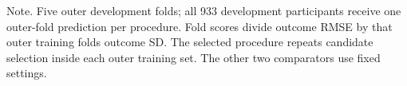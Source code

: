 \documentclass[11pt,letterpaper]{article}
\begin{document}
\nopagebreak

Note. Five outer development folds; all 933 development participants receive one outer-fold prediction per procedure. Fold scores divide outcome RMSE by that outer training fold\textquotesingle s outcome SD. The selected procedure repeats candidate selection inside each outer training set. The other two comparators use fixed settings.

\endgroup


\par\medskip{}\par\nopagebreak

\begingroup\singlespacing\fontsize{10}{12}\selectfont\setlength{\parindent}{0pt}
\end{document}
